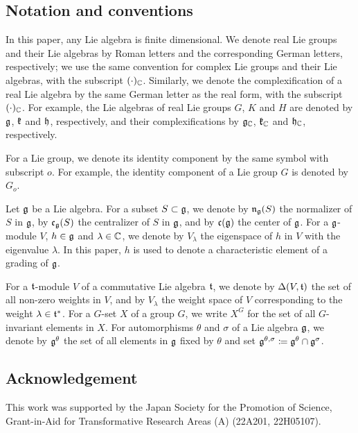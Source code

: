 \subsection*{Notation and conventions}

In this paper, any Lie algebra is finite dimensional.
We denote real Lie groups and their Lie algebras by Roman letters and the corresponding German letters, respectively; we use the same convention for complex Lie groups and their Lie algebras, with the subscript $(\cdot)_{\mathbb{C}}$.
Similarly, we denote the complexification of a real Lie algebra by the same German letter as the real form, with the subscript $(\cdot)_{\mathbb{C}}$.
For example, the Lie algebras of real Lie groups $G$, $K$ and $H$ are denoted by $\mathfrak{g}$, $\mathfrak{k}$ and $\mathfrak{h}$, respectively, and their complexifications by $\mathfrak{g}_{\mathbb{C}}$, $\mathfrak{k}_{\mathbb{C}}$ and $\mathfrak{h}_{\mathbb{C}}$, respectively.

For a Lie group, we denote its identity component by the same symbol with subscript $o$.
For example, the identity component of a Lie group $G$ is denoted by $G_o$.

Let $\mathfrak{g}$ be a Lie algebra.
For a subset $S\subset \mathfrak{g}$, we denote by $\mathfrak{n}_{\mathfrak{g}}(S)$ the normalizer of $S$ in $\mathfrak{g}$, by $\mathfrak{c}_{\mathfrak{g}}(S)$ the centralizer of $S$ in $\mathfrak{g}$, and by $\mathfrak{c}(\mathfrak{g})$ the center of $\mathfrak{g}$.
For a $\mathfrak{g}$-module $V$, $h \in \mathfrak{g}$ and $\lambda \in \mathbb{C}$, we denote by $V_\lambda$ the eigenspace of $h$ in $V$ with the eigenvalue $\lambda$.
In this paper, $h$ is used to denote a characteristic element of a grading of $\mathfrak{g}$.

For a $\mathfrak{t}$-module $V$ of a commutative Lie algebra $\mathfrak{t}$, we denote by $\Delta(V, \mathfrak{t})$ the set of all non-zero weights in $V$, and by $V_\lambda$ the weight space of $V$ corresponding to the weight $\lambda \in \mathfrak{t}^*$.
For a $G$-set $X$ of a group $G$, we write $X^G$ for the set of all $G$-invariant elements in $X$.
For automorphisms $\theta$ and $\sigma$ of a Lie algebra $\mathfrak{g}$, we denote by $\mathfrak{g}^\theta$ the set of all elements in $\mathfrak{g}$ fixed by $\theta$ and set $\mathfrak{g}^{\theta, \sigma} \coloneq \mathfrak{g}^\theta \cap \mathfrak{g}^\sigma$.

\subsection*{Acknowledgement}

This work was supported by the Japan Society for the Promotion of Science, Grant-in-Aid for Transformative Research Areas (A) (22A201, 22H05107).